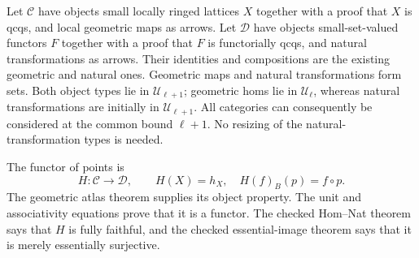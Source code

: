 \documentclass[11pt]{amsart}
\theoremstyle{definition}\newtheorem{definition}[theorem]{Definition}
\theoremstyle{remark}\newtheorem{remark}[theorem]{Remark}
\newcommand{\UU}{\mathcal U}
\begin{document}
Let $\mathcal C$ have objects small locally ringed lattices $X$ together
with a proof that $X$ is qcqs, and local geometric maps as arrows. Let
$\mathcal D$ have objects small-set-valued functors $F$ together with a
proof that $F$ is functorially qcqs, and natural transformations as arrows.
Their identities and compositions are the existing geometric and natural
ones. Geometric maps and natural transformations form sets. Both object
types lie in $\UU_{\ell+1}$; geometric homs lie in $\UU_\ell$, whereas
natural transformations are initially in $\UU_{\ell+1}$. All categories
can consequently be considered at the common bound $\ell+1$.
No resizing of the natural-transformation types is needed.

The functor of points is
\[
 H:\mathcal C\longrightarrow\mathcal D,\qquad
 H(X)=h_X,\quad H(f)_B(p)=f\circ p.
\]
The geometric atlas theorem supplies its object property. The unit and
associativity equations prove that it is a functor. The checked
Hom--Nat theorem says that $H$ is fully faithful, and the checked
essential-image theorem says that it is merely essentially surjective.
\end{document}
